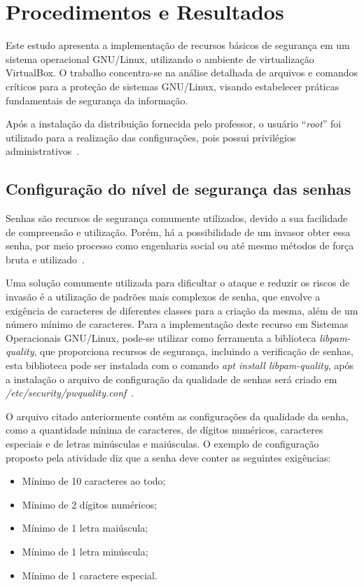 \documentclass[
    12pt,				%
    oneside,   	        %
    a4paper,			%
    english,			%
    french,				%
    spanish,			%
    brazil,				%
    ]{pacotes/abntex2}
\begin{document}
\section{Procedimentos e Resultados}
\label{sec:procedimentos}

Este estudo apresenta a implementação de recursos básicos de segurança em um sistema operacional GNU/Linux, utilizando o ambiente de virtualização VirtualBox. O trabalho concentra-se na análise detalhada de arquivos e comandos críticos para a proteção de sistemas GNU/Linux, visando estabelecer práticas fundamentais de segurança da informação.

Após a instalação da distribuição fornecida pelo professor, o usuário ``\textit{root}'' foi utilizado para a realização das configurações, pois possui privilégios administrativos~\cite{negus2012}.

\subsection{Configuração do nível de segurança das senhas}
\label{subsec:senhas}

Senhas são recursos de segurança comumente utilizados, devido a sua facilidade de compreensão e utilização. Porém, há a possibilidade de um invasor obter essa senha, por meio processo como engenharia social ou até mesmo métodos de força bruta e utilizado~\cite{silberschatz2015}.

Uma solução comumente utilizada para dificultar o ataque e reduzir os riscos de invasão é a utilização de padrões mais complexos de senha, que envolve a exigência de caracteres de diferentes classes para a criação da mesma, além de um número mínimo de caracteres. Para a implementação deste recurso em Sistemas Operacionais GNU/Linux, pode-se utilizar como ferramenta a biblioteca \textit{libpam-quality}, que proporciona recursos de segurança, incluindo a verificação de senhas, esta biblioteca pode ser instalada com o comando \textit{apt install libpam-quality}, após a instalação o arquivo de configuração da qualidade de senhas será criado em \textit{/etc/security/pwquality.conf}~\cite{libpam-pwquality}.

O arquivo citado anteriormente contém as configurações da qualidade da senha, como a quantidade mínima de caracteres, de dígitos numéricos, caracteres especiais e de letras minúsculas e maiúsculas. O exemplo de configuração proposto pela atividade diz que a senha deve conter as seguintes exigências:

\begin{itemize}
    \item Mínimo de 10 caracteres ao todo;
    \item Mínimo de 2 dígitos numéricos;
    \item Mínimo de 1 letra maiúscula;
    \item Mínimo de 1 letra minúscula;
    \item Mínimo de 1 caractere especial.
\end{itemize}
\end{document}

